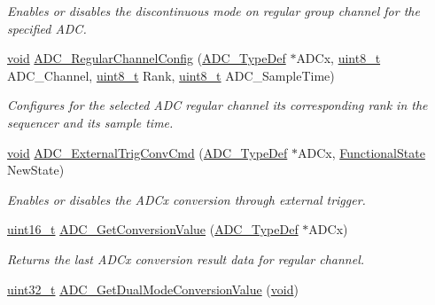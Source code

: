 \begin{DoxyCompactItemize}
\begin{DoxyCompactList}\small\item\em Enables or disables the discontinuous mode on regular group channel for the specified A\+DC. \end{DoxyCompactList}\item 
\hyperlink{usb__devapi_8h_afabf60e7f57651d6d595a02c75f07cd0}{void} \hyperlink{group___a_d_c___exported___functions_gac531adb577b648d4bb8881f2ed627d52}{A\+D\+C\+\_\+\+Regular\+Channel\+Config} (\hyperlink{struct_a_d_c___type_def}{A\+D\+C\+\_\+\+Type\+Def} $\ast$A\+D\+Cx, \hyperlink{_p_e___types_8h_aba7bc1797add20fe3efdf37ced1182c5}{uint8\+\_\+t} A\+D\+C\+\_\+\+Channel, \hyperlink{_p_e___types_8h_aba7bc1797add20fe3efdf37ced1182c5}{uint8\+\_\+t} Rank, \hyperlink{_p_e___types_8h_aba7bc1797add20fe3efdf37ced1182c5}{uint8\+\_\+t} A\+D\+C\+\_\+\+Sample\+Time)
\begin{DoxyCompactList}\small\item\em Configures for the selected A\+DC regular channel its corresponding rank in the sequencer and its sample time. \end{DoxyCompactList}\item 
\hyperlink{usb__devapi_8h_afabf60e7f57651d6d595a02c75f07cd0}{void} \hyperlink{group___a_d_c___exported___functions_ga3ae92d7940a16c898223374a5857f509}{A\+D\+C\+\_\+\+External\+Trig\+Conv\+Cmd} (\hyperlink{struct_a_d_c___type_def}{A\+D\+C\+\_\+\+Type\+Def} $\ast$A\+D\+Cx, \hyperlink{agilefox_2library_2inc_2stm32f10x__type_8h_ac9a7e9a35d2513ec15c3b537aaa4fba1}{Functional\+State} New\+State)
\begin{DoxyCompactList}\small\item\em Enables or disables the A\+D\+Cx conversion through external trigger. \end{DoxyCompactList}\item 
\hyperlink{_p_e___types_8h_a1f1825b69244eb3ad2c7165ddc99c956}{uint16\+\_\+t} \hyperlink{group___a_d_c___exported___functions_gaaf74221c285ec5dab5e66baf7bec6bd3}{A\+D\+C\+\_\+\+Get\+Conversion\+Value} (\hyperlink{struct_a_d_c___type_def}{A\+D\+C\+\_\+\+Type\+Def} $\ast$A\+D\+Cx)
\begin{DoxyCompactList}\small\item\em Returns the last A\+D\+Cx conversion result data for regular channel. \end{DoxyCompactList}\item 
\hyperlink{_p_e___types_8h_a33594304e786b158f3fb30289278f5af}{uint32\+\_\+t} \hyperlink{group___a_d_c___exported___functions_gac5a4792dc29ef7ff6bfbce9f37e8a668}{A\+D\+C\+\_\+\+Get\+Dual\+Mode\+Conversion\+Value} (\hyperlink{usb__devapi_8h_afabf60e7f57651d6d595a02c75f07cd0}{void})

\end{DoxyCompactItemize}
